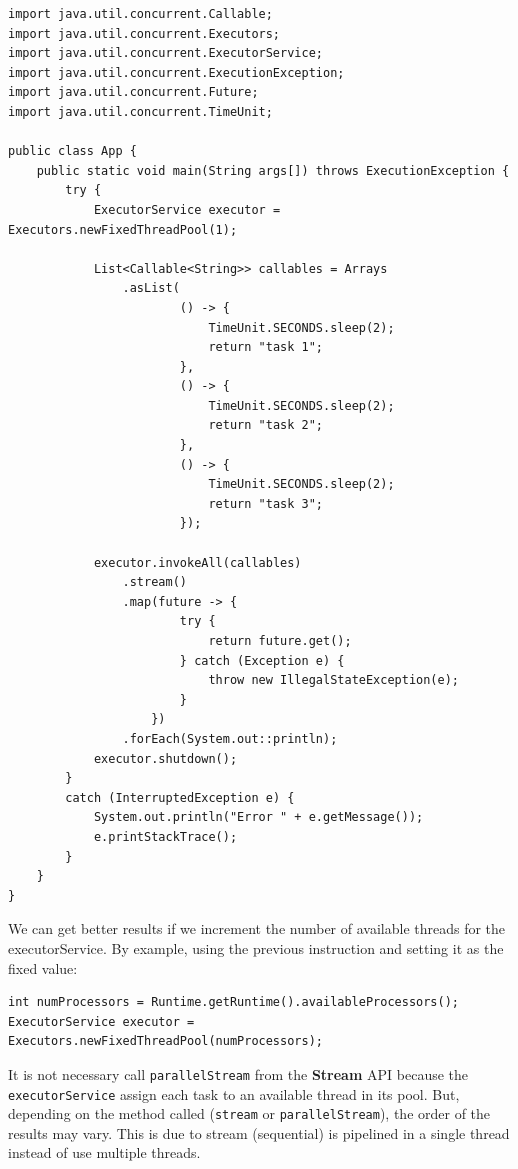\documentclass{latex/classes/thesis}
\begin{document}
\begin{enumerate}
\begin{lstlisting}
import java.util.concurrent.Callable;
import java.util.concurrent.Executors;
import java.util.concurrent.ExecutorService;
import java.util.concurrent.ExecutionException;
import java.util.concurrent.Future;
import java.util.concurrent.TimeUnit;

public class App {
    public static void main(String args[]) throws ExecutionException {
        try {
            ExecutorService executor = Executors.newFixedThreadPool(1);

            List<Callable<String>> callables = Arrays
                .asList(
                        () -> {
                            TimeUnit.SECONDS.sleep(2);
                            return "task 1";
                        },
                        () -> {
                            TimeUnit.SECONDS.sleep(2);
                            return "task 2";
                        },
                        () -> {
                            TimeUnit.SECONDS.sleep(2);
                            return "task 3";
                        });

            executor.invokeAll(callables)
                .stream()
                .map(future -> {
                        try {
                            return future.get();
                        } catch (Exception e) {
                            throw new IllegalStateException(e);
                        }
                    })
                .forEach(System.out::println);
            executor.shutdown();
        }
        catch (InterruptedException e) {
            System.out.println("Error " + e.getMessage());
            e.printStackTrace();
        }
    }
}
\end{lstlisting}

We can get better results if we increment the number of available threads
for the executorService. By example, using the previous instruction and
setting it as the fixed value:

\begin{lstlisting}
int numProcessors = Runtime.getRuntime().availableProcessors();
ExecutorService executor = Executors.newFixedThreadPool(numProcessors);
\end{lstlisting}

It is not necessary call \texttt{parallelStream} from the \textbf{Stream} API because the
\texttt{executorService} assign each task to an available thread in its pool. But,
depending on the method called (\texttt{stream} or \texttt{parallelStream}), the order of the
results may vary. This is due to stream (sequential) is pipelined in a
single thread instead of use multiple threads.
\end{enumerate}
\end{document}
